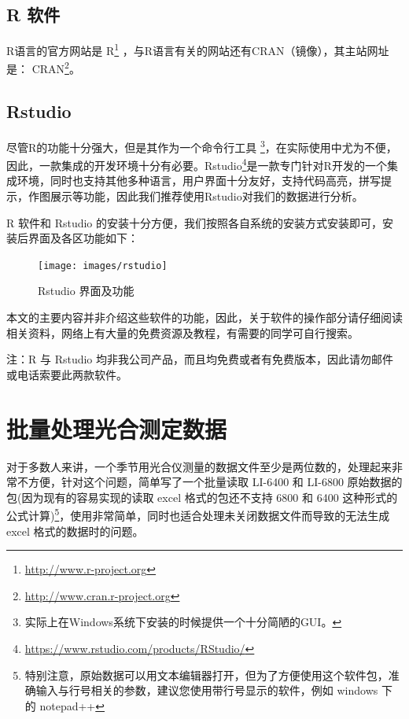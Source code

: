 \documentclass[
]{krantz}
\renewenvironment{quote}{\begin{VF}}{\end{VF}}
\renewcommand{\href}[2]{#2\footnote{\url{#1}}}
\begin{document}
\hypertarget{rsoft}{%
\section{R 软件}\label{rsoft}}

R语言的官方网站是 \href{http://www.r-project.org}{R} ，与R语言有关的网站还有CRAN（镜像），其主站网址是： \href{http://www.cran.r-project.org}{CRAN}。

\hypertarget{rstudiosoft}{%
\section{Rstudio}\label{rstudiosoft}}

尽管R的功能十分强大，但是其作为一个命令行工具 \footnote{实际上在Windows系统下安装的时候提供一个十分简陋的GUI。}，在实际使用中尤为不便，因此，一款集成的开发环境十分有必要。\href{https://www.rstudio.com/products/RStudio/}{Rstudio}是一款专门针对R开发的一个集成环境，同时也支持其他多种语言，用户界面十分友好，支持代码高亮，拼写提示，作图展示等功能，因此我们推荐使用Rstudio对我们的数据进行分析。

R 软件和 Rstudio 的安装十分方便，我们按照各自系统的安装方式安装即可，安装后界面及各区功能如下：

\begin{figure}
\texttt{[image: images/rstudio]} \caption{Rstudio 界面及功能}\label{fig:unnamed-chunk-2}
\end{figure}

本文的主要内容并非介绍这些软件的功能，因此，关于软件的操作部分请仔细阅读相关资料，网络上有大量的免费资源及教程，有需要的同学可自行搜索。

\begin{quote}
注：R 与 Rstudio 均非我公司产品，而且均免费或者有免费版本，因此请勿邮件或电话索要此两款软件。
\end{quote}

\cleardoublepage

\hypertarget{batch_question}{%
\chapter{批量处理光合测定数据}\label{batch_question}}

对于多数人来讲，一个季节用光合仪测量的数据文件至少是两位数的，处理起来非常不方便，针对这个问题，简单写了一个批量读取 LI-6400 和 LI-6800 原始数据的包(因为现有的容易实现的读取 excel 格式的包还不支持 6800 和 6400 这种形式的公式计算)\footnote{特别注意，原始数据可以用文本编辑器打开，但为了方便使用这个软件包，准确输入与行号相关的参数，建议您使用带行号显示的软件，例如 windows 下的 notepad++}，使用非常简单，同时也适合处理未关闭数据文件而导致的无法生成 excel 格式的数据时的问题。
\end{document}
